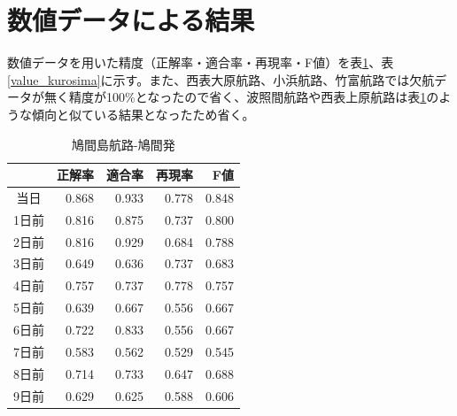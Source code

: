 \documentclass[twocolumn,twoside,9.5pt]{jsarticle}
\begin{document}
\section{数値データによる結果}
数値データを用いた精度（正解率・適合率・再現率・F値）を表\ref{value_hatoma}、表\ref{value_kurosima}に示す。また、西表大原航路、小浜航路、竹富航路では欠航データが無く精度が100\%となったので省く、波照間航路や西表上原航路は表\ref{value_hatoma}のような傾向と似ている結果となったため省く。
\begin{table}[H]
  \begin{center}
    \caption{鳩間島航路-鳩間発}
    \begin{tabular}{|c|r|r|r|r|} \hline
   &正解率 & 適合率 & 再現率 & F値 \\ \hline
      当日&0.868 &0.933 &0.778 &0.848 \\ \hline
     1日前 & 0.816 & 0.875 & 0.737 & 0.800 \\ \hline
      2日前 & 0.816 & 0.929 & 0.684 & 0.788 \\ \hline
      3日前 & 0.649 & 0.636 & 0.737 & 0.683 \\ \hline 
      4日前 & 0.757 & 0.737 & 0.778 & 0.757 \\ \hline 
      5日前 & 0.639 & 0.667 & 0.556 & 0.667 \\ \hline 
      6日前 & 0.722 & 0.833 & 0.556 & 0.667 \\ \hline 
      7日前 & 0.583 & 0.562 & 0.529 & 0.545 \\ \hline 
      8日前 & 0.714 & 0.733 & 0.647 & 0.688 \\ \hline 
      9日前 & 0.629 & 0.625 & 0.588 & 0.606 \\ \hline 
          
    \end{tabular}    
    \label{value_hatoma}
  \end{center}
\end{table}
\end{document}
